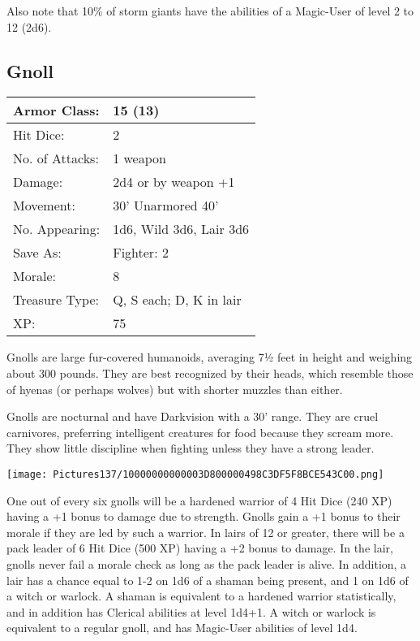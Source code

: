 \documentclass[a4paper,twoside,openany,10pt]{book}
\begin{document}
\begin{multicols}{2}
Also note that 10\% of storm giants have the abilities of a Magic-User of level 2 to 12 (2d6).


\subsection*{Gnoll}\label{gnoll}

\begin{tabularx}{0.48\textwidth}{@{}lX@{}}
Armor Class: & 15 (13) \\\hline
Hit Dice: & 2 \\\hline
No. of Attacks: & 1 weapon \\\hline
Damage: & 2d4 or by weapon +1 \\\hline
Movement: & 30' Unarmored 40' \\\hline
No. Appearing: & 1d6, Wild 3d6, Lair 3d6 \\\hline
Save As: & Fighter: 2 \\\hline
Morale: & 8 \\\hline
Treasure Type: & Q, S each; D, K in lair \\\hline
XP: & 75 \\\hline
\end{tabularx}\medskip

Gnolls are large fur-covered humanoids, averaging 7½ feet in height and weighing about 300 pounds. They are best recognized by their heads, which resemble those of hyenas (or perhaps wolves) but with shorter muzzles than either.

Gnolls are nocturnal and have Darkvision with a 30' range. They are cruel carnivores, preferring intelligent creatures for food because they scream more. They show little discipline when fighting unless they have a strong leader.


\begin{center}
	\texttt{[image: Pictures137/10000000000003D800000498C3DF5F8BCE543C00.png]}
\end{center}


One out of every six gnolls will be a hardened warrior of 4 Hit Dice (240 XP) having a +1 bonus to damage due to strength. Gnolls gain a +1 bonus to their morale if they are led by such a warrior. In lairs of 12 or greater, there will be a pack leader of 6 Hit Dice (500 XP) having a +2 bonus to damage. In the lair, gnolls never fail a morale check as long as the pack leader is alive. In addition, a lair has a chance equal to 1-2 on 1d6 of a shaman being present, and 1 on 1d6 of a witch or warlock. A shaman is equivalent to a hardened warrior statistically, and in addition has Clerical abilities at level 1d4+1. A witch or warlock is equivalent to a regular gnoll, and has Magic-User abilities of level 1d4.


\end{multicols}
\end{document}
